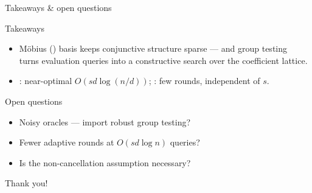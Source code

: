 \documentclass[aspectratio=169,11pt]{beamer}
\begin{document}
\begin{frame}{Takeaways \& open questions}
  \begin{block}{Takeaways}
    \begin{itemize}
      \item M\"obius (\AND) basis keeps conjunctive structure sparse --- and group testing\\
            turns evaluation queries into a constructive search over the coefficient lattice.
      \item \FASMT: near-optimal $O(sd\log(n/d))$; \PASMT: few rounds, independent of $s$.
    \end{itemize}
  \end{block}
  \begin{block}{Open questions}
    \begin{itemize}
      \item Noisy oracles --- import robust group testing?
      \item Fewer adaptive rounds at $O(sd\log n)$ queries?
      \item Is the non-cancellation assumption necessary?
    \end{itemize}
  \end{block}
  \vspace{1ex}
  \centering \alert{Thank you!}
\end{frame}
\end{document}
